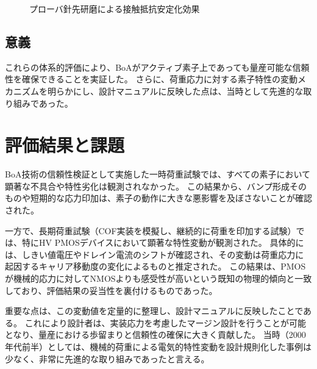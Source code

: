 \documentclass[conference]{IEEEtran}
\begin{document}
\begin{figure}[t]
  \centering
  \caption{プローバ針先研磨による接触抵抗安定化効果}
\end{figure}

\subsection{意義}
これらの体系的評価により、BoAがアクティブ素子上であっても量産可能な信頼性を確保できることを実証した。  
さらに、荷重応力に対する素子特性の変動メカニズムを明らかにし、設計マニュアルに反映した点は、当時として先進的な取り組みであった。

\section{評価結果と課題}
BoA技術の信頼性検証として実施した一時荷重試験では、すべての素子において顕著な不具合や特性劣化は観測されなかった。  
この結果から、バンプ形成そのものや短期的な応力印加は、素子の動作に大きな悪影響を及ぼさないことが確認された。  

一方で、長期荷重試験（COF実装を模擬し、継続的に荷重を印加する試験）では、特にHV PMOSデバイスにおいて顕著な特性変動が観測された。  
具体的には、しきい値電圧やドレイン電流のシフトが確認され、その変動は荷重応力に起因するキャリア移動度の変化によるものと推定された。  
この結果は、PMOSが機械的応力に対してNMOSよりも感受性が高いという既知の物理的傾向と一致しており、評価結果の妥当性を裏付けるものであった。  

重要な点は、この変動値を定量的に整理し、設計マニュアルに反映したことである。  
これにより設計者は、実装応力を考慮したマージン設計を行うことが可能となり、量産における歩留まりと信頼性の確保に大きく貢献した。  
当時（2000年代前半）としては、機械的荷重による電気的特性変動を設計規則化した事例は少なく、非常に先進的な取り組みであったと言える。  
\end{document}

